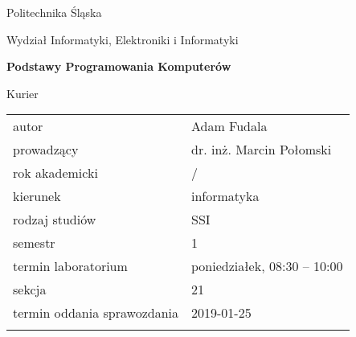 \documentclass[12pt,a4paper,twoside]{article}
\newcounter{rok}
\newcommand{\rokakademicki}{%
   \setcounter{rok}{\number\year}%
   \ifthenelse{\number\month<10}%
   {\addtocounter{rok}{-1}}%
   {}%
   \arabic{rok}/\addtocounter{rok}{1}\arabic{rok}
}
\begin{document}
\frenchspacing
\thispagestyle{empty}
\begin{center}
{\Large\sf Politechnika Śląska   %

Wydział Informatyki, Elektroniki i Informatyki

}

\vfill

 

\vfill\vfill

{\Huge\sffamily\bfseries Podstawy Programowania Komputerów\par}  

\vfill\vfill

{\LARGE\sf Kurier}   


\vfill \vfill\vfill\vfill






\begin{tabular}{ll}
	\toprule
	autor                       & Adam Fudala    \\
	prowadzący                  &  dr. inż. Marcin Połomski \\
	rok akademicki              & \rokakademicki         \\
	kierunek                    & informatyka            \\
	rodzaj studiów              & SSI                    \\
	semestr                     & 1                      \\
	termin laboratorium         & poniedziałek, 08:30 -- 10:00 \\
	sekcja                      & 21            \\
	termin oddania sprawozdania & 2019-01-25            \\
	\bottomrule
	                            &
\end{tabular}

\end{center}

\cleardoublepage

\end{document}

